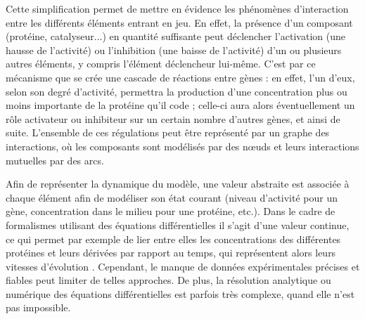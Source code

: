 Cette simplification permet de mettre en évidence les phénomènes d'interaction entre
les différents éléments entrant en jeu.
En effet, la présence d'un composant (protéine, catalyseur...)
en quantité suffisante peut déclencher
l'activation (une hausse de l'activité) ou l'inhibition (une baisse de l'activité)
d'un ou plusieurs autres éléments, y compris l'élément déclencheur lui-même.
C'est par ce mécanisme que se crée une cascade de réactions entre gènes :
en effet, l'un d'eux, selon son degré d'activité,
permettra la production d'une concentration plus ou moins importante de la protéine qu'il code ;
celle-ci aura alors éventuellement un rôle activateur ou inhibiteur sur un certain
nombre d'autres gènes, et ainsi de suite.
L'ensemble de ces régulations peut être représenté par un graphe des interactions,
où les composants sont modélisés par des nœuds et leurs interactions mutuelles par des arcs.


Afin de représenter la dynamique du modèle,
une valeur abstraite est associée à chaque élément afin de modéliser
son état courant
(niveau d'activité pour un gène,
concentration dans le milieu pour une protéine, etc.).
Dans le cadre de formalismes utilisant des équations différentielles
il s'agit d'une valeur continue,
ce qui permet par exemple de lier entre elles
les concentrations des différentes protéines et leurs dérivées par rapport au temps,
qui représentent alors leurs vitesses d'évolution \cite{tyson1978dynamics}.
Cependant, le manque de données expérimentales précises et fiables peut limiter de telles
approches.
De plus, la résolution analytique ou numérique des équations différentielles est parfois
très complexe, quand elle n'est pas impossible.

